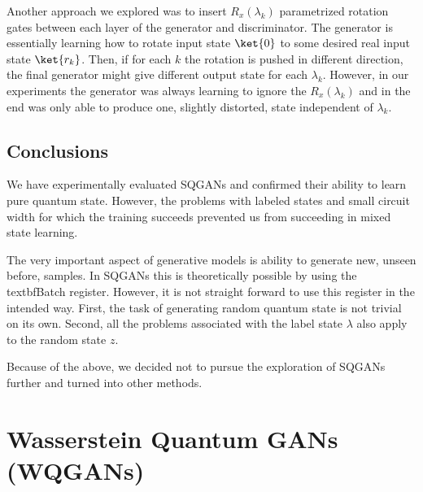 Another approach we explored was to insert $R_x(\lambda_k)$ parametrized
rotation gates between each layer of the generator and discriminator. The
generator is essentially learning how to rotate input state $\ket{0}$ to some
desired real input state $\ket{r_k}$. Then, if for each $k$ the rotation is
pushed in different direction, the final generator might give different output
state for each $\lambda_k$. However, in our experiments the generator was always
learning to ignore the $R_x(\lambda_k)$ and in the end was only able to produce
one, slightly distorted, state independent of $\lambda_k$.

\subsection{Conclusions}
We have experimentally evaluated SQGANs and confirmed their ability to learn
pure quantum state. However, the problems with labeled states and small
circuit width for which the training succeeds prevented us from succeeding in
mixed state learning.

The very important aspect of generative models is ability to generate new,
unseen before, samples. In SQGANs this is theoretically possible by using the
textbf{Batch} register. However, it is not straight forward to use this register
in the intended way. First, the task of generating random quantum state is not
trivial on its own. Second, all the problems associated with the label state
$\lambda$ also apply to the random state $z$. 

Because of the above, we decided not to pursue the exploration of SQGANs further
and turned into other methods.


\section{Wasserstein Quantum GANs (WQGANs)}
  


